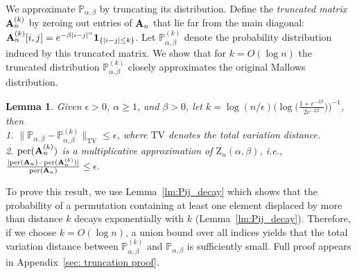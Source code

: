 \documentclass{article}
\newcommand{\bA}{\bold{A}}
\renewcommand{\P}{\mathbb{P}}
\newcommand{\Z}{\mathrm{Z}}
\newtheorem{lemma}[theorem]{Lemma}     %
\begin{document}
We approximate $\P_{\alpha,\beta}$ by truncating its distribution. 
Define the  \emph{truncated matrix} \( {\bA}_n^{(k)} \) by zeroing out entries of  \( {\bA}_n \) that lie far from the main diagonal: ${\bA}_n^{(k)}[i,j]=e^{-\beta |i - j|^\alpha}\mathbf{1}_{\{|i-j|\leq k\}}$. 
Let ${\P}_{\alpha,\beta}^{(k)}$ denote the probability distribution induced by this truncated matrix. We show that for \( k = O(\log n)\)  the truncated distribution $ \P_{\alpha,\beta}^{(k)}$ closely approximates the original Mallows distribution.

\begin{center}
    
\end{center}








\begin{lemma}\label{lm:tv_distance}
Given \( \epsilon > 0 \), \( \alpha \geq 1 \), and \( \beta > 0 \),  let \( k  = \log(n/\epsilon) \Big(\log\big({\frac{1+e^{-2\beta}}{2e^{-2\beta}}}\big)\Big)^{-1} \), then\\
1. $\|\P_{\alpha,\beta} - {\P}_{\alpha,\beta}^{(k)}\|_{\text{TV}} \leq \epsilon$, where $\text{TV}$ denotes the total variation distance. \\
2. $\text{per}({\bA}_n^{(k)})$ is a multiplicative approximation of $\Z_n(\alpha,\beta)$, i.e., 
$\frac{|\text{per}({\bA}_n) - \text{per}({\bA}_n^{(k)})|}{\text{per}({\bA}_n)} \leq \epsilon.$
\end{lemma}
To prove this result, we use Lemma~\ref{lm:Pij_decay} which shows that the probability of a permutation containing at least one element displaced by more than distance $k$ decays exponentially with $k$ (Lemma~\ref{lm:Pij_decay}). Therefore, if we choose $k=O(\log n)$, a union bound over all indices yields that the total variation distance between ${\P}_{\alpha,\beta}^{(k)}$ and $\P_{\alpha,\beta}$ is sufficiently small. 
Full proof appears in Appendix~\ref{sec: truncation proof}.
\end{document}
